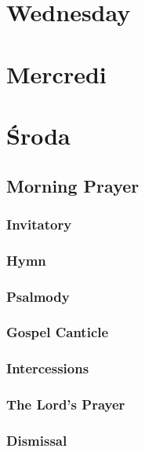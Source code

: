 




\pagestyle{empty}
\tableofcontents*

\pagestyle{fancy}

\chapter[Wednesday * Mercredi * Środa][Wednesday]{Wednesday\\\myrulev\\Mercredi\\\myrulev\\Środa}
\section[Morning Prayer]{Morning Prayer}
\begin{english}

\subsection*{Invitatory}




\subsection*{Hymn}


\subsection*{Psalmody}








\subsection*{Gospel Canticle}


\subsection*{Intercessions}


\subsection*{The Lord’s Prayer}




\subsection*{Dismissal}

\end{english}

